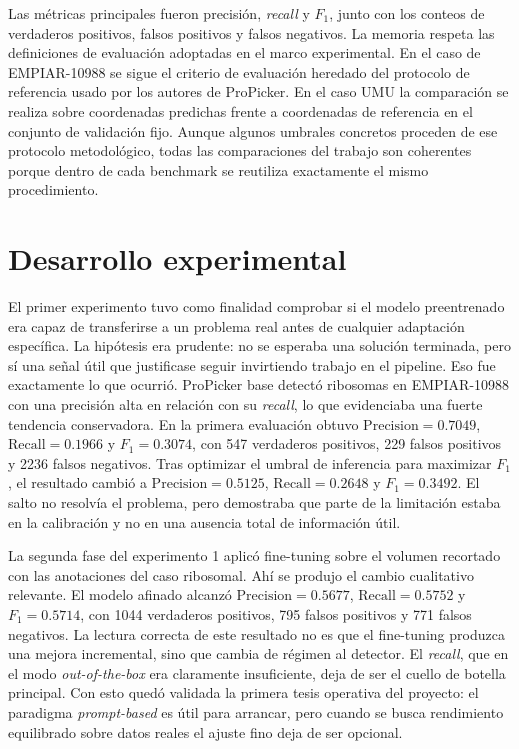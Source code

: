 \documentclass[12pt,a4paper]{report}
\begin{document}
Las métricas principales fueron precisión, \emph{recall} y \(F_1\), junto con los conteos de verdaderos positivos, falsos positivos y falsos negativos. La memoria respeta las definiciones de evaluación adoptadas en el marco experimental. En el caso de EMPIAR-10988 se sigue el criterio de evaluación heredado del protocolo de referencia usado por los autores de ProPicker. En el caso UMU la comparación se realiza sobre coordenadas predichas frente a coordenadas de referencia en el conjunto de validación fijo. Aunque algunos umbrales concretos proceden de ese protocolo metodológico, todas las comparaciones del trabajo son coherentes porque dentro de cada benchmark se reutiliza exactamente el mismo procedimiento.

\section*{Desarrollo experimental}
El primer experimento tuvo como finalidad comprobar si el modelo preentrenado era capaz de transferirse a un problema real antes de cualquier adaptación específica. La hipótesis era prudente: no se esperaba una solución terminada, pero sí una señal útil que justificase seguir invirtiendo trabajo en el pipeline. Eso fue exactamente lo que ocurrió. ProPicker base detectó ribosomas en EMPIAR-10988 con una precisión alta en relación con su \emph{recall}, lo que evidenciaba una fuerte tendencia conservadora. En la primera evaluación obtuvo \(\mathrm{Precision}=0.7049\), \(\mathrm{Recall}=0.1966\) y \(F_1=0.3074\), con 547 verdaderos positivos, 229 falsos positivos y 2236 falsos negativos. Tras optimizar el umbral de inferencia para maximizar \(F_1\), el resultado cambió a \(\mathrm{Precision}=0.5125\), \(\mathrm{Recall}=0.2648\) y \(F_1=0.3492\). El salto no resolvía el problema, pero demostraba que parte de la limitación estaba en la calibración y no en una ausencia total de información útil.

La segunda fase del experimento 1 aplicó fine-tuning sobre el volumen recortado con las anotaciones del caso ribosomal. Ahí se produjo el cambio cualitativo relevante. El modelo afinado alcanzó \(\mathrm{Precision}=0.5677\), \(\mathrm{Recall}=0.5752\) y \(F_1=0.5714\), con 1044 verdaderos positivos, 795 falsos positivos y 771 falsos negativos. La lectura correcta de este resultado no es que el fine-tuning produzca una mejora incremental, sino que cambia de régimen al detector. El \emph{recall}, que en el modo \emph{out-of-the-box} era claramente insuficiente, deja de ser el cuello de botella principal. Con esto quedó validada la primera tesis operativa del proyecto: el paradigma \emph{prompt-based} es útil para arrancar, pero cuando se busca rendimiento equilibrado sobre datos reales el ajuste fino deja de ser opcional.
\end{document}
